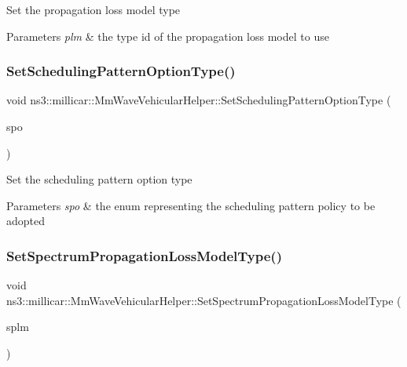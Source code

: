 Set the propagation loss model type 
\begin{DoxyParams}{Parameters}
{\em plm} & the type id of the propagation loss model to use \\
\hline
\end{DoxyParams}
\mbox{\label{classns3_1_1millicar_1_1MmWaveVehicularHelper_a909144ad73428efd96a27612757ec08a}} 
\subsubsection{\texorpdfstring{Set\+Scheduling\+Pattern\+Option\+Type()}{SetSchedulingPatternOptionType()}}
{\footnotesize\ttfamily void ns3\+::millicar\+::\+Mm\+Wave\+Vehicular\+Helper\+::\+Set\+Scheduling\+Pattern\+Option\+Type (\begin{DoxyParamCaption}\item[{\hyperlink{classns3_1_1millicar_1_1MmWaveVehicularHelper_a7b56a1dec16b395a2b07f3e2267bc8e8}{Scheduling\+Pattern\+Option\+\_\+t}}]{spo }\end{DoxyParamCaption})}

Set the scheduling pattern option type 
\begin{DoxyParams}{Parameters}
{\em spo} & the enum representing the scheduling pattern policy to be adopted \\
\hline
\end{DoxyParams}
\mbox{\label{classns3_1_1millicar_1_1MmWaveVehicularHelper_ae03289dc88f603994c8ec5649756878f}} 
\subsubsection{\texorpdfstring{Set\+Spectrum\+Propagation\+Loss\+Model\+Type()}{SetSpectrumPropagationLossModelType()}}
{\footnotesize\ttfamily void ns3\+::millicar\+::\+Mm\+Wave\+Vehicular\+Helper\+::\+Set\+Spectrum\+Propagation\+Loss\+Model\+Type (\begin{DoxyParamCaption}\item[{std\+::string}]{splm }\end{DoxyParamCaption})}

